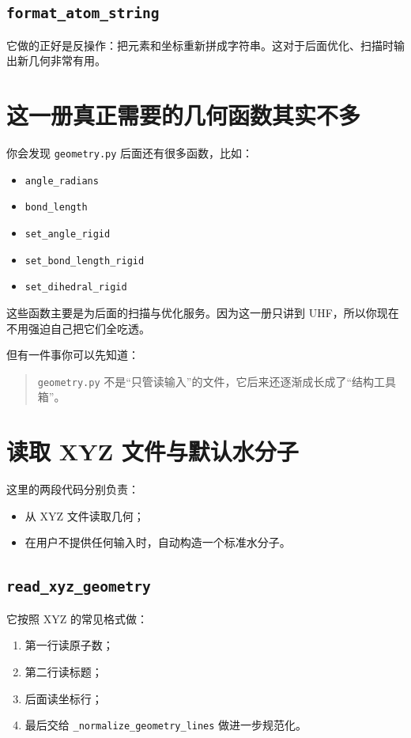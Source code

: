 \documentclass[UTF8,11pt,fontset=fandol]{ctexbook}
\begin{document}
\subsection*{\texttt{format\_atom\_string}}

它做的正好是反操作：把元素和坐标重新拼成字符串。这对于后面优化、扫描时输出新几何非常有用。

\section{这一册真正需要的几何函数其实不多}

你会发现 \texttt{geometry.py} 后面还有很多函数，比如：
\begin{itemize}
  \item \texttt{angle\_radians}
  \item \texttt{bond\_length}
  \item \texttt{set\_angle\_rigid}
  \item \texttt{set\_bond\_length\_rigid}
  \item \texttt{set\_dihedral\_rigid}
\end{itemize}

这些函数主要是为后面的扫描与优化服务。因为这一册只讲到 UHF，所以你现在不用强迫自己把它们全吃透。

但有一件事你可以先知道：

\begin{quote}
\texttt{geometry.py} 不是“只管读输入”的文件，它后来还逐渐成长成了“结构工具箱”。
\end{quote}

\section{读取 XYZ 文件与默认水分子}



这里的两段代码分别负责：
\begin{itemize}
  \item 从 XYZ 文件读取几何；
  \item 在用户不提供任何输入时，自动构造一个标准水分子。
\end{itemize}

\subsection*{\texttt{read\_xyz\_geometry}}

它按照 XYZ 的常见格式做：
\begin{enumerate}[label=\arabic*.]
  \item 第一行读原子数；
  \item 第二行读标题；
  \item 后面读坐标行；
  \item 最后交给 \texttt{\_normalize\_geometry\_lines} 做进一步规范化。
\end{enumerate}
\end{document}
